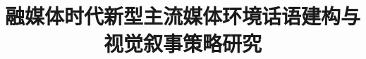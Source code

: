 \documentclass[man,12pt,mask,floatsintext]{apa7}
\title{融媒体时代新型主流媒体环境话语建构与视觉叙事策略研究}
\renewcommand{\notesname}{参考文献}
\begin{document}
\maketitle

\clearpage
\renewcommand{\notesname}{参考文献}
\renewcommand{\enoteheading}{\section*{参考文献}}
\theendnotes
\end{document}
